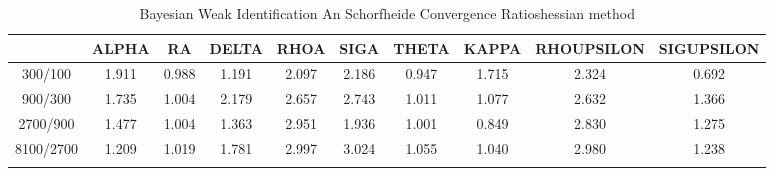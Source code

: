 \documentclass[a4paper,10pt]{article}
\begin{document}
\centering
\begin{longtable}{cccccccccc}
\toprule
 & ALPHA & RA & DELTA & RHOA & SIGA & THETA & KAPPA & RHOUPSILON & SIGUPSILON \\
\midrule
300/100 & 1.911 & 0.988 & 1.191 & 2.097 & 2.186 & 0.947 & 1.715 & 2.324 & 0.692 \\
900/300 & 1.735 & 1.004 & 2.179 & 2.657 & 2.743 & 1.011 & 1.077 & 2.632 & 1.366 \\
2700/900 & 1.477 & 1.004 & 1.363 & 2.951 & 1.936 & 1.001 & 0.849 & 2.830 & 1.275 \\
8100/2700 & 1.209 & 1.019 & 1.781 & 2.997 & 3.024 & 1.055 & 1.040 & 2.980 & 1.238 \\
\bottomrule
\caption{Bayesian Weak Identification An Schorfheide Convergence Ratioshessian method}
\label{table:tbl:WeakAnSchoConvergenceRatios_hessian}
\end{longtable}
\end{document}
